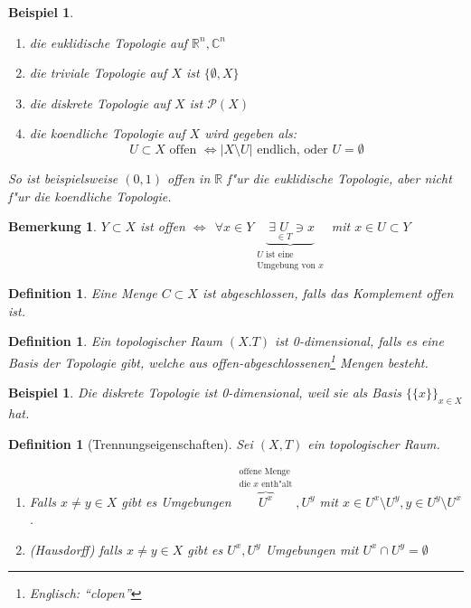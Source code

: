 \documentclass[a4paper,12pt,numbers=noenddot,parskip=full]{scrartcl}
\newcommand{\setR}{\mathbb{R}}
\newcommand{\setC}{\mathbb{C}}
\newcommand{\Forall}{~\forall}
\newcommand{\Exists}{~\exists}
\newcommand{\scrP}{\mathcal{P}}
\theoremstyle{dotless}
\newtheorem{definition}[theorem]{Definition}
\newtheorem{example}[theorem]{Beispiel}
\newtheorem{remark}[theorem]{Bemerkung}
\begin{document}
\begin{example}
	\begin{enumerate}
		\item die euklidische Topologie auf $\setR^n, \setC^n$
		\item die triviale Topologie auf $X$ ist $\{\emptyset, X \}$
		\item die diskrete Topologie auf $X$ ist $\scrP(X)$
		\item die koendliche Topologie auf $X$ wird gegeben als: 
		\begin{equation*}
			U \subset X \text{ offen } \Longleftrightarrow |X \setminus U| \text{ endlich, oder } U = \emptyset
		\end{equation*}
	\end{enumerate}
	So ist beispielsweise $(0,1)$ offen in $\setR$ f"ur die euklidische Topologie, aber nicht f"ur die koendliche Topologie.
\end{example}
\begin{remark}
	$Y \subset X$ ist offen $\Longleftrightarrow~ \Forall x \in Y \underbrace{\Exists \underset{\in T}{U} \ni x}_{\substack{U \text{ ist eine}\\ \text{Umgebung von } x}}$ mit $x \in U \subset Y$
\end{remark}
\begin{definition}
	Eine Menge $C \subset X$ ist \emph{abgeschlossen}, falls das Komplement offen ist.
\end{definition}
\begin{definition}
	Ein topologischer Raum $(X.T)$ ist \emph{0-dimensional}, falls es eine Basis der Topologie gibt, welche aus offen-abgeschlossenen\footnote{Englisch: "`clopen"'} Mengen besteht.
\end{definition}
\begin{example}
	Die diskrete Topologie ist \emph{0-dimensional}, weil sie als Basis $\{\{x\} \}_{x \in X}$ hat.
\end{example}
\begin{definition}[Trennungseigenschaften]
	Sei $(X, T)$ ein topologischer Raum.
	\begin{enumerate}
		\item[T1] \label{T1} Falls $x \neq y \in X$ gibt es Umgebungen $\overbrace{U^x}^{\substack{\text{offene Menge}\\ \text{die } x \text{ enth"alt}}}, U^y$ mit $x \in U^x \setminus U^y, y \in U^y \setminus U^x$.
		\item[T2] \label{T2} (Hausdorff) falls $x \neq y \in X$ gibt es $U^x, U^y$ Umgebungen mit $U^x \cap U^y = \emptyset$
	\end{enumerate}
\end{definition}
\end{document}
